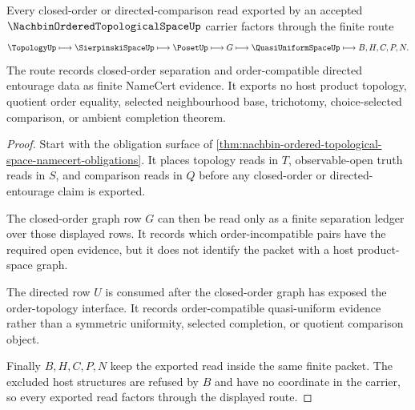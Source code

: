 \begin{theorem}\label{thm:nachbin-ordered-topological-space-closed-order-scope}
Every closed-order or directed-comparison read exported by an accepted $\NachbinOrderedTopologicalSpaceUp$ carrier factors through the finite route
$$
\TopologyUp
\longmapsto
\SierpinskiSpaceUp
\longmapsto
\PosetUp
\longmapsto
G
\longmapsto
\QuasiUniformSpaceUp
\longmapsto
B,H,C,P,N .
$$
The route records closed-order separation and order-compatible directed entourage data as finite NameCert evidence. It exports no host product topology, quotient order equality, selected neighbourhood base, trichotomy, choice-selected comparison, or ambient completion theorem.
\end{theorem}
\begin{proof}
Start with the obligation surface of \autoref{thm:nachbin-ordered-topological-space-namecert-obligations}. It places topology reads in $T$, observable-open truth reads in $S$, and comparison reads in $Q$ before any closed-order or directed-entourage claim is exported.

The closed-order graph row $G$ can then be read only as a finite separation ledger over those displayed rows. It records which order-incompatible pairs have the required open evidence, but it does not identify the packet with a host product-space graph.

The directed row $U$ is consumed after the closed-order graph has exposed the order-topology interface. It records order-compatible quasi-uniform evidence rather than a symmetric uniformity, selected completion, or quotient comparison object.

Finally $B,H,C,P,N$ keep the exported read inside the same finite packet. The excluded host structures are refused by $B$ and have no coordinate in the carrier, so every exported read factors through the displayed route.
\end{proof}



